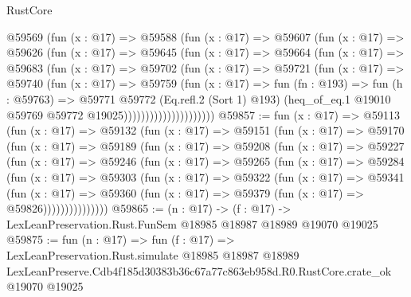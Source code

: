 \begin{lexlean}{RustCore}
\begin{coremodule}
                    @59569
                      (fun (x : @17) =>
                      @59588
                        (fun (x : @17) =>
                        @59607
                          (fun (x : @17) =>
                          @59626
                            (fun (x : @17) =>
                            @59645
                              (fun (x : @17) =>
                              @59664
                                (fun (x : @17) =>
                                @59683
                                  (fun (x : @17) =>
                                  @59702
                                    (fun (x : @17) =>
                                    @59721
                                      (fun (x : @17) =>
                                      @59740
                                        (fun (x : @17) =>
                                        @59759
                                          (fun (x : @17) =>
                                          fun (fn : @193) =>
                                          fun (h : @59763) =>
                                          @59771
                                            @59772
                                            (Eq.refl.{2} (Sort 1) @193)
                                            (heq_of_eq.{1}
                                              @19010
                                              @59769
                                              @59772
                                              @19025)))))))))))))))))))))
@59857 := fun (x : @17) =>
  @59113
    (fun (x : @17) =>
    @59132
      (fun (x : @17) =>
      @59151
        (fun (x : @17) =>
        @59170
          (fun (x : @17) =>
          @59189
            (fun (x : @17) =>
            @59208
              (fun (x : @17) =>
              @59227
                (fun (x : @17) =>
                @59246
                  (fun (x : @17) =>
                  @59265
                    (fun (x : @17) =>
                    @59284
                      (fun (x : @17) =>
                      @59303
                        (fun (x : @17) =>
                        @59322
                          (fun (x : @17) =>
                          @59341
                            (fun (x : @17) =>
                            @59360 (fun (x : @17) => @59379 (fun (x : @17) => @59826)))))))))))))))
@59865 := (n : @17) ->
  (f : @17) -> LexLeanPreservation.Rust.FunSem @18985 @18987 @18989 @19070 @19025
@59875 := fun (n : @17) =>
  fun (f : @17) =>
  LexLeanPreservation.Rust.simulate
    @18985
    @18987
    @18989
    LexLeanPreserve.Cdb4f185d30383b36c67a77c863eb958d.R0.RustCore.crate_ok
    @19070
    @19025
\end{coremodule}
\end{lexlean}
